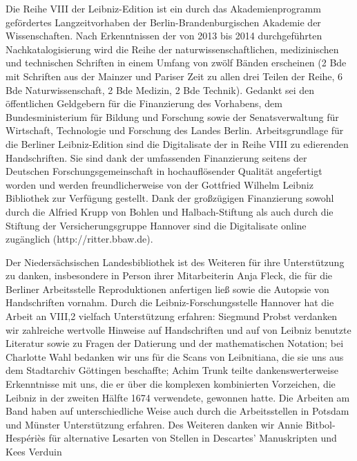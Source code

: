 \thispagestyle{empty}
{\vrule height 0mm depth 30mm width 0mm}
\vspace*{2em}
\par\noindent 
Die Reihe VIII der Leibniz-Edition ist ein durch das Akademienprogramm gefördertes Langzeitvorhaben der Berlin-Brandenburgischen Akademie der Wissenschaften. Nach Erkenntnissen der von 2013 bis 2014 durchgeführten Nachkatalogisierung wird die Reihe der naturwissenschaftlichen, medizinischen und technischen Schriften in einem Umfang von zwölf Bänden erscheinen (2 Bde mit Schriften aus der Mainzer und Pariser Zeit zu allen drei Teilen der Reihe, 6 Bde Naturwissenschaft, 2 Bde Medizin, 2 Bde Technik). 
\newline\indent
Gedankt sei den öffentlichen Geldgebern für die Finanzierung des Vorhabens, dem Bundesministerium für Bildung und Forschung sowie der Senatsverwaltung für Wirtschaft, Technologie und Forschung des Landes Berlin. Arbeitsgrundlage für die Berliner Leibniz-Edition sind die Digitalisate der in Reihe VIII zu edierenden Handschriften. Sie sind dank der umfassenden Finanzierung seitens der Deutschen Forschungsgemeinschaft in hochauflösender Qualität angefertigt worden und werden freundlicherweise von der Gottfried Wilhelm Leibniz Bibliothek zur Verfügung gestellt. Dank der großzügigen Finanzierung sowohl durch die Alfried Krupp von Bohlen und Halbach-Stiftung als auch durch die Stiftung der Versicherungsgruppe Hannover sind die Digitalisate online zugänglich (http://ritter.bbaw.de). \par
Der Niedersächsischen Landesbibliothek ist des Weiteren für ihre Unterstützung zu danken, insbesondere in Person ihrer Mitarbeiterin Anja Fleck, die für die Berliner Arbeitsstelle Reproduktionen anfertigen ließ sowie die Autopsie von Handschriften vornahm. Durch die Leibniz-Forschungsstelle Hannover hat die Arbeit an VIII,2 vielfach Unterstützung erfahren: Siegmund Probst verdanken wir zahlreiche wertvolle Hinweise auf Handschriften und auf von Leibniz benutzte Literatur sowie zu Fragen der Datierung und der mathematischen Notation; bei Charlotte Wahl bedanken wir uns für die Scans  von Leibnitiana, die sie uns aus dem Stadtarchiv Göttingen beschaffte; Achim Trunk teilte dankenswerterweise Erkenntnisse mit uns, die er über die komplexen kombinierten Vorzeichen, die Leibniz in der zweiten Hälfte 1674 verwendete, gewonnen hatte. Die Arbeiten am Band haben auf unterschiedliche Weise auch durch die Arbeitsstellen in Potsdam und Münster Unterstützung erfahren. Des Weiteren danken wir Annie Bitbol-Hespériès für alternative Lesarten von Stellen in Descartes' Manuskripten und Kees Verduin
